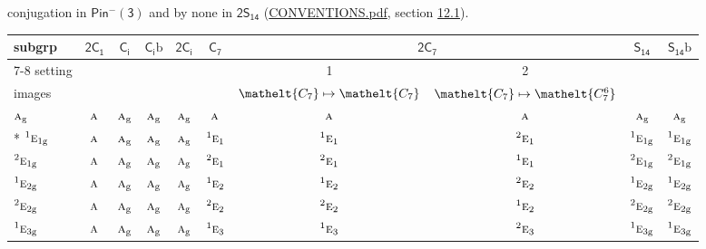 \documentclass[10pt,a4paper]{article}
\numberwithin{equation}{section}
\newcommand{\eltfont}[1]{{\let\sigma\eltsigma\mathelt{#1}}}
\newcommand{\grp}[1]{\mathsf{#1}}
\newcommand{\irr}[1]{\text{\normalfont\scshape #1}}
\newcommand{\conjpair}[1]{{}^{#1}}
\newcommand{\cls}[1]{\eltfont{#1}}
\newcommand{\ptag}[1]{\mathrm{#1}}
\newcommand{\secondclass}{\mathrm{b}}
\begin{document}
conjugation in \href{Pinminus3.pdf}{$\grp{Pin^{-}(3)}$} and by none in $\grp{2S_{14}}$ (\href{../../CONVENTIONS.pdf}{CONVENTIONS.pdf}, section \href{../../../rotation/CONVENTIONS.pdf\#conv.12.1}{12.1}).
{\small\begin{longtable}{@{}lccccccccc@{}}\toprule
subgrp & \href{2C1.pdf}{$\grp{2C_{1}}$} & \href{S2.pdf}{$\grp{C_{i}}$} & \href{S2b.pdf}{$\grp{C_{i}}\secondclass$} & \href{2S2.pdf}{$\grp{2C_{i}}$} & \href{C7.pdf}{$\grp{C_{7}}$} & \multicolumn{2}{c}{\href{2C7.pdf}{$\grp{2C_{7}}$}} & \href{S14.pdf}{$\grp{S_{14}}$} & \href{S14b.pdf}{$\grp{S_{14}}\secondclass$}\\\cmidrule(lr){7-8}
setting &  &  &  &  &  & 1 & 2 &  & \\
images &  &  &  &  &  & {\scriptsize $\cls{C_{7}} \mapsto \cls{C_{7}}$} & {\scriptsize $\cls{C_{7}} \mapsto \cls{C_{7}^{6}}$} &  & \\\midrule\endhead
\bottomrule\endfoot\endlastfoot
$\irr{a}_{\ptag{g}}$ & $\irr{a}$ & $\irr{a}_{\ptag{g}}$ & $\irr{a}_{\ptag{g}}$ & $\irr{a}_{\ptag{g}}$ & $\irr{a}$ & $\irr{a}$ & $\irr{a}$ & $\irr{a}_{\ptag{g}}$ & $\irr{a}_{\ptag{g}}$\\*
$\conjpair{1}\irr{e}_{1\ptag{g}}$ & $\irr{a}$ & $\irr{a}_{\ptag{g}}$ & $\irr{a}_{\ptag{g}}$ & $\irr{a}_{\ptag{g}}$ & $\conjpair{1}\irr{e}_{1}$ & $\conjpair{1}\irr{e}_{1}$ & $\conjpair{2}\irr{e}_{1}$ & $\conjpair{1}\irr{e}_{1\ptag{g}}$ & $\conjpair{1}\irr{e}_{1\ptag{g}}$\\
$\conjpair{2}\irr{e}_{1\ptag{g}}$ & $\irr{a}$ & $\irr{a}_{\ptag{g}}$ & $\irr{a}_{\ptag{g}}$ & $\irr{a}_{\ptag{g}}$ & $\conjpair{2}\irr{e}_{1}$ & $\conjpair{2}\irr{e}_{1}$ & $\conjpair{1}\irr{e}_{1}$ & $\conjpair{2}\irr{e}_{1\ptag{g}}$ & $\conjpair{2}\irr{e}_{1\ptag{g}}$\\
$\conjpair{1}\irr{e}_{2\ptag{g}}$ & $\irr{a}$ & $\irr{a}_{\ptag{g}}$ & $\irr{a}_{\ptag{g}}$ & $\irr{a}_{\ptag{g}}$ & $\conjpair{1}\irr{e}_{2}$ & $\conjpair{1}\irr{e}_{2}$ & $\conjpair{2}\irr{e}_{2}$ & $\conjpair{1}\irr{e}_{2\ptag{g}}$ & $\conjpair{1}\irr{e}_{2\ptag{g}}$\\
$\conjpair{2}\irr{e}_{2\ptag{g}}$ & $\irr{a}$ & $\irr{a}_{\ptag{g}}$ & $\irr{a}_{\ptag{g}}$ & $\irr{a}_{\ptag{g}}$ & $\conjpair{2}\irr{e}_{2}$ & $\conjpair{2}\irr{e}_{2}$ & $\conjpair{1}\irr{e}_{2}$ & $\conjpair{2}\irr{e}_{2\ptag{g}}$ & $\conjpair{2}\irr{e}_{2\ptag{g}}$\\
$\conjpair{1}\irr{e}_{3\ptag{g}}$ & $\irr{a}$ & $\irr{a}_{\ptag{g}}$ & $\irr{a}_{\ptag{g}}$ & $\irr{a}_{\ptag{g}}$ & $\conjpair{1}\irr{e}_{3}$ & $\conjpair{1}\irr{e}_{3}$ & $\conjpair{2}\irr{e}_{3}$ & $\conjpair{1}\irr{e}_{3\ptag{g}}$ & $\conjpair{1}\irr{e}_{3\ptag{g}}$\\

\end{longtable}}
\end{document}
